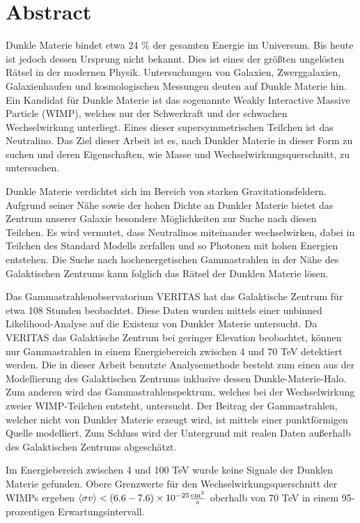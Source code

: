 \cleartooddpage[\thispagestyle{empty}]
\section*{Abstract}


Dunkle Materie bindet etwa 24 \% der gesamten Energie im Universum.
Bis heute ist jedoch dessen Ursprung nicht bekannt.
Dies ist eines der gr{\"o}{\ss}ten ungel{\"o}sten  R{\"a}tsel in der modernen Physik.
Untersuchungen von Galaxien, Zwerggalaxien, Galaxienhaufen und kosmologischen Messungen deuten auf Dunkle Materie hin.
Ein Kandidat f{\"u}r Dunkle Materie ist das sogenannte Weakly Interactive Massive Particle (WIMP), welches nur der Schwerkraft und der schwachen Wechselwirkung unterliegt.
Eines dieser supersymmetrischen Teilchen ist das Neutralino.
Das Ziel dieser Arbeit ist es, nach Dunkler Materie in dieser Form zu suchen und deren Eigenschaften, wie Masse und Wechselwirkungsquerschnitt, zu untersuchen.

Dunkle Materie verdichtet sich im Bereich von starken Gravitationsfeldern.
Aufgrund seiner N{\"a}he sowie der hohen Dichte an Dunkler Materie bietet das Zentrum unserer Galaxie besondere M{\"o}glichkeiten zur Suche nach diesen Teilchen.
Es wird vermutet, dass Neutralinos miteinander wechselwirken, dabei in Teilchen des Standard Modells zerfallen und so Photonen mit hohen Energien entstehen.
Die Suche nach hochenergetischen Gammastrahlen in der N{\"a}he des Galaktischen Zentrums kann folglich das R{\"a}tsel der Dunklen Materie l{\"o}sen.

Das Gammastrahlenobservatorium VERITAS hat das Galaktische Zentrum f{\"u}r etwa 108 Stunden beobachtet.
Diese Daten wurden mittels einer unbinned Likelihood-Analyse auf die Existenz von Dunkler Materie untersucht.
Da VERITAS das Galaktische Zentrum bei geringer Elevation beobachtet, k{\"o}nnen nur Gammastrahlen in einem Energiebereich zwischen 4 und 70 TeV detektiert werden.
Die in dieser Arbeit benutzte Analysemethode besteht zum einen aus der Modellierung des Galaktischen Zentrums inklusive dessen Dunkle-Materie-Halo.
Zum anderen wird das Gammastrahlenspektrum, welches bei der Wechselwirkung zweier WIMP-Teilchen entsteht, untersucht.
Der Beitrag der Gammastrahlen, welcher nicht von Dunkler Materie erzeugt wird, ist mittels einer punktf{\"o}rmigen Quelle modelliert.
Zum Schluss wird der Untergrund mit realen Daten au{\ss}erhalb des Galaktischen Zentrums abgesch{\"a}tzt.

Im Energiebereich zwischen 4 und 100 TeV wurde keine Signale der Dunklen Materie gefunden.
Obere Grenzwerte f{\"u}r den Wechselwirkungsquerschnitt der WIMPs ergeben ${\left \langle \sigma v \right \rangle < (6.6-7.6) \times 10^{-25} \frac{\mathrm{cm}^3}{\mathrm{s}}}$ oberhalb von 70 TeV in einem 95-prozentigen Erwartungsintervall.





\cleartoevenpage[\thispagestyle{plain}]
\null
